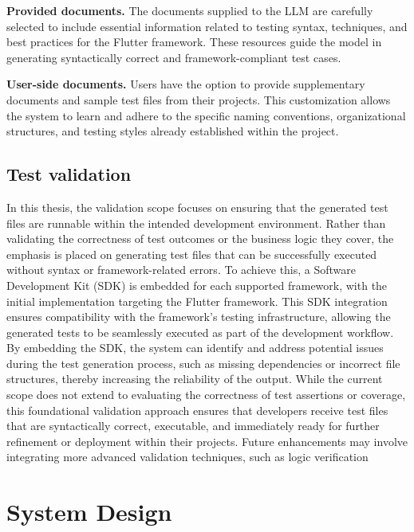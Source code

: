 \hspace{0.5cm}\textbf{Provided documents.}	The documents supplied to the LLM are carefully selected to include essential information related to testing syntax, techniques, and best practices for the Flutter framework. These resources guide the model in generating syntactically correct and framework-compliant test cases.

\hspace{0.5cm}\textbf{User-side documents.}	Users have the option to provide supplementary documents and sample test files from their projects. This customization allows the system to learn and adhere to the specific naming conventions, organizational structures, and testing styles already established within the project.

\subsection{Test validation}

\hspace{0.5cm}In this thesis, the validation scope focuses on ensuring that the generated test files are runnable within the intended development environment. Rather than validating the correctness of test outcomes or the business logic they cover, the emphasis is placed on generating test files that can be successfully executed without syntax or framework-related errors.
To achieve this, a Software Development Kit (SDK) is embedded for each supported framework, with the initial implementation targeting the Flutter framework. This SDK integration ensures compatibility with the framework's testing infrastructure, allowing the generated tests to be seamlessly executed as part of the development workflow. By embedding the SDK, the system can identify and address potential issues during the test generation process, such as missing dependencies or incorrect file structures, thereby increasing the reliability of the output.
\hspace{0.5cm}While the current scope does not extend to evaluating the correctness of test assertions or coverage, this foundational validation approach ensures that developers receive test files that are syntactically correct, executable, and immediately ready for further refinement or deployment within their projects. Future enhancements may involve integrating more advanced validation techniques, such as logic verification 

\section{System Design}

